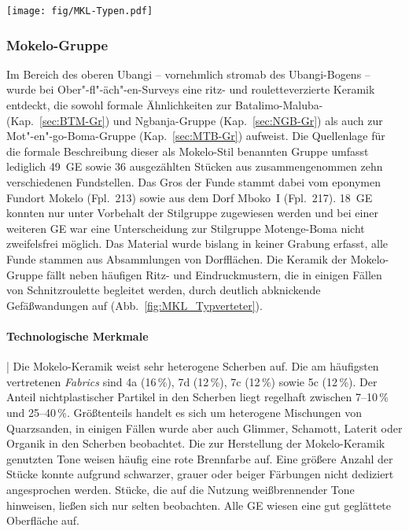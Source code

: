 \begin{figure*}[tb]
	\centering
	\texttt{[image: fig/MKL-Typen.pdf]}
	\caption{Mokelo-Gruppe: Typvertreter aus Batanga (Fpl.~209), Mondoli (Fpl.~212), Mokelo (Fpl.~213) und Mboko~I (Fpl.~217).\\1:~Taf.~18.8; 2:~Taf.~18.1; 3:~Taf.~18.4; 4:~Taf.~18.3; 5:~Taf.~18.7; 6:~Taf.~17.4; 7:~Taf.~21.5; 8:~Taf.~16.3.}
	\label{fig:MKL_Typverteter}
\end{figure*}

\subsubsection{Mokelo-Gruppe}\label{sec:MKL-Gr}

Im Bereich des oberen \mbox{Ubangi} -- vornehmlich stromab des \mbox{Ubangi}-Bogens -- wurde bei Ober"-fl"-äch"-en-Surveys eine ritz- und rouletteverzierte Keramik entdeckt, die sowohl formale Ähnlichkeiten zur Batalimo-Maluba- (Kap.~\ref{sec:BTM-Gr}) und \mbox{Ngbanja}-Gruppe (Kap.~\ref{sec:NGB-Gr}) als auch zur Mot"-en"-go-Boma-Gruppe (Kap.~\ref{sec:MTB-Gr}) aufweist. Die Quellenlage für die formale Beschreibung dieser als Mokelo-Stil benannten Gruppe umfasst lediglich 49~GE sowie 36 ausgezählten Stücken aus zusammengenommen zehn verschiedenen Fundstellen. Das Gros der Funde stammt dabei vom eponymen Fundort Mokelo (Fpl.~213) sowie aus dem Dorf Mboko~I (Fpl.~217). 18~GE konnten nur unter Vorbehalt der Stilgruppe zugewiesen werden und bei einer weiteren GE war eine Unterscheidung zur Stilgruppe Motenge-Boma nicht zweifelsfrei möglich. Das Material wurde bislang in keiner Grabung erfasst, alle Funde stammen aus Absammlungen von Dorfflächen. Die Keramik der Mokelo-Gruppe fällt neben häufigen Ritz- und Eindruckmustern, die in einigen Fällen von Schnitzroulette begleitet werden, durch deutlich abknickende Gefäßwandungen auf (Abb.~\ref{fig:MKL_Typverteter}).

\paragraph{Technologische Merkmale}\hspace{-.5em}|\hspace{.5em}%
Die Mokelo-Keramik weist sehr heterogene Scherben auf. Die am häufigsten vertretenen \textit{Fabrics} sind 4a (16\,\%), 7d (12\,\%), 7c (12\,\%) sowie 5c (12\,\%). Der Anteil nichtplastischer Partikel in den Scherben liegt regelhaft zwischen 7--10\,\% und 25--40\,\%. Größtenteils handelt es sich um heterogene Mischungen von Quarzsanden, in einigen Fällen wurde aber auch Glimmer, Schamott, Laterit oder Organik in den Scherben beobachtet. Die zur Herstellung der Mokelo-Keramik genutzten Tone weisen häufig eine rote Brennfarbe auf. Eine größere Anzahl der Stücke konnte aufgrund schwarzer, grauer oder beiger Färbungen nicht dediziert angesprochen werden. Stücke, die auf die Nutzung weißbrennender Tone hinweisen, ließen sich nur selten beobachten. Alle GE wiesen eine gut geglättete Oberfläche auf.


